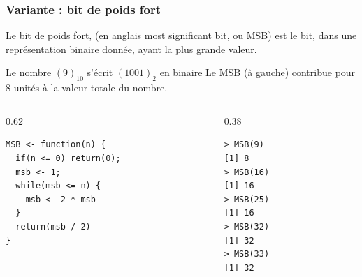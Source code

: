\documentclass[10pt]{beamer}
\begin{document}
\begin{frame}[fragile]
  \frametitle{Variante : bit de poids fort}
  Le bit de poids fort, (en anglais \alert{most significant bit}, ou MSB) est le bit, dans une représentation binaire donnée, ayant la plus grande valeur.

  \begin{exampleblock}{Le nombre $(9)_{10}$ s'écrit $(1001)_2$ en binaire}
    Le MSB (à gauche) contribue pour 8 unités à la valeur totale du nombre.
  \end{exampleblock}


\begin{columns}[t]
\begin{column}{0.62\textwidth}
\begin{lstlisting}[style=editor]
MSB <- function(n) {
  if(n <= 0) return(0);
  msb <- 1;
  while(msb <= n) {
    msb <- 2 * msb
  }
  return(msb / 2)
}
\end{lstlisting}
\end{column}
\begin{column}{0.38\textwidth}
  \begin{lstlisting}
> MSB(9)
[1] 8
> MSB(16)
[1] 16
> MSB(25)
[1] 16
> MSB(32)
[1] 32
> MSB(33)
[1] 32
\end{lstlisting}
\end{column}
\end{columns}
\end{frame}
\end{document}

